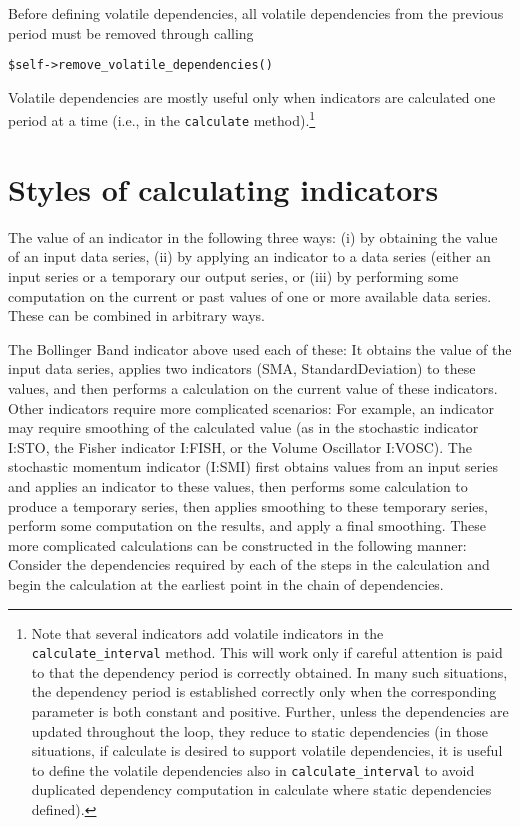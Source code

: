 \documentclass[11pt,twoside]{article}
\begin{document}
Before defining volatile dependencies, all volatile dependencies from
the previous period must be removed through calling
\begin{lstlisting}[numbers=none]
$self->remove_volatile_dependencies()
\end{lstlisting}

Volatile dependencies are mostly useful only when indicators are
calculated one period at a time (i.e., in the
\lstinline!calculate! method).\footnote{Note that several
indicators add volatile indicators in the
\lstinline!calculate_interval! method. This will work only if
careful attention is paid to that the dependency period is correctly
obtained. In many such situations, the dependency period is established
correctly only when the corresponding parameter is both constant and
positive. Further, unless the dependencies are updated throughout the
loop, they reduce to static dependencies (in those situations, if
calculate is desired to support volatile dependencies, it is useful to
define the volatile dependencies also in \lstinline!calculate_interval!
to avoid duplicated dependency computation in calculate where static
dependencies defined).}

\section{Styles of calculating indicators}
The value of an indicator in the following three ways: (i) by obtaining
the value of an input data series, (ii) by applying an indicator to a
data series (either an input series or a temporary our output series,
or (iii) by performing some computation on the current or past values
of one or more available data series. These can be combined in
arbitrary ways.

The Bollinger Band indicator above used each of these: It obtains the
value of the input data series, applies two indicators (SMA,
StandardDeviation) to these values, and then performs a calculation on
the current value of these indicators. Other indicators require more
complicated scenarios: For example, an indicator may require smoothing
of the calculated value (as in the stochastic indicator I:STO, the
Fisher indicator I:FISH, or the Volume Oscillator I:VOSC). The
stochastic momentum indicator (I:SMI) first obtains values from an
input series and applies an indicator to these values, then performs
some calculation to produce a temporary series, then applies smoothing
to these temporary series, perform some computation on the results, and
apply a final smoothing. These more complicated calculations can be
constructed in the following manner: Consider the dependencies required
by each of the steps in the calculation and begin the calculation at
the earliest point in the chain of dependencies.
\end{document}
